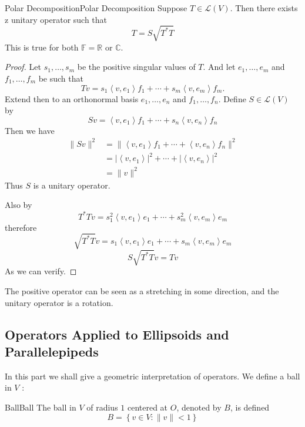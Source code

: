 \documentclass[../main.tex]{subfiles}
\begin{document}
\begin{theorem}{Polar Decomposition}{Polar Decomposition}
Suppose $T\in \mathscr{L}(V)$. Then there exists z unitary operator such that
\begin{equation*}
T=S \sqrt{T^*T}
\end{equation*}
This is true for both $\mathbb{F}=\mathbb{R}$ or $\mathbb{C}$.
\end{theorem}
\begin{proof}
Let $s_1, \ldots ,s_m$ be the positive singular values of $T$. And let $e_1, \ldots ,e_m$ and $f_1, \ldots ,f_m$ be such that
\begin{equation*}
Tv = s_1 \left<v,e_1\right>f_1 +\cdots +s_m \left<v,e_m\right>f_m.
\end{equation*}
Extend then to an orthonormal basis $e_1, \ldots ,e_n$ and $f_1, \ldots ,f_n$. Define $S\in \mathscr{L}(V)$ by
\begin{equation*}
Sv = \left<v,e_1\right>f_1 +\cdots +s_n \left<v,e_n\right>f_n
\end{equation*}
Then we have
\begin{equation*}
\begin{aligned}
	\|Sv\|^2 &= \|\left<v,e_1\right>f_1 +\cdots + \left<v,e_n\right>f_n \|^2 \\
		 &= \left|\left<v,e_1\right>\right|^2 +\cdots + \left|\left<v,e_n\right>\right|^2\\
		 &= \|v\|^2
\end{aligned}
\end{equation*}
Thus $S$ is a unitary operator.

Also by
\begin{equation*}
T^*Tv = s_1^2 \left<v,e_1\right>e_1+\cdots + s_m^2 \left<v,e_m\right>e_m
\end{equation*}
therefore
\begin{equation*}
\sqrt{T^*T}v = s_1 \left<v,e_1\right>e_1 +\cdots + s_m \left<v,e_m\right>e_m
\end{equation*}
\begin{equation*}
S \sqrt{T^*T}v = Tv
\end{equation*}
As we can verify.
\end{proof}

\begin{remark}
The positive operator can be seen as a stretching in some direction, and the unitary operator is a rotation.
\end{remark}

\subsection{Operators Applied to Ellipsoids and Parallelepipeds}
In this part we shall give a geometric interpretation of operators. We define a ball in  $V$ :
\begin{definition}{Ball}{Ball}
The ball in $V$ of radius $1$ centered at $O$, denoted by $B$, is defined
\begin{equation}
B = \left\{ v\in V: \|v\|<1 \right\}
\end{equation}
\end{definition}
\end{document}
